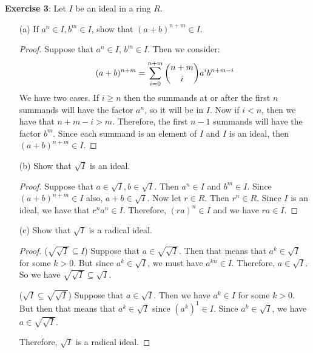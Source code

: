 \documentclass{article}
\begin{document}
\textbf{Exercise 3}: Let $I$ be an ideal in a ring $R$. 
    \begin{itemize}
        \item [(a)] If $a^{n} \in I, b^{m} \in I$, show that $(a + b)^{n + m} \in I$.
            \begin{proof}
                Suppose that $a^{n} \in I$, $b^{m} \in I$. Then we consider:
                    \begin{equation*}
                        (a + b)^{n + m} = \sum_{i = 0}^{n + m} \dbinom{n +  m}{i}a^{i}b^{n + m - i}
                    \end{equation*}
                We have two cases. If $i \geq n$ then the summands at or after the first $n$ summands will have the factor $a^{n}$, so it will be in $I$. Now if $i < n$, then we have that $n + m - i > m$. Therefore, the first $n - 1$ summands will have the factor $b^{m}$. Since each summand is an element of $I$ and $I$ is an ideal, then $(a + b)^{n + m} \in I$.
            \end{proof}

        \item [(b)] Show that $\sqrt{I}$ is an ideal.
            \begin{proof}
                Suppose that $a \in \sqrt{I}, b \in \sqrt{I}$. Then $a^{n} \in I$ and $b^{m} \in I$. Since $(a + b)^{n + m} \in I$ also, $a + b \in \sqrt{I}$. Now let $r \in R$. Then $r^{n} \in R$. Since $I$ is an ideal, we have that $r^{n}a^{n} \in I$. Therefore, $(ra)^{n} \in I$ and we have $ra \in I$.
            \end{proof}

        \item [(c)] Show that $\sqrt{I}$ is a radical ideal.
            \begin{proof}
                ($\sqrt{\sqrt{I}} \subseteq I$) Suppose that $a \in \sqrt{\sqrt{I}}$. Then that means that $a^{k} \in \sqrt{I}$ for some $k > 0$. But since $a^{k} \in \sqrt{I}$, we must have $a^{kn} \in I$. Therefore, $a \in \sqrt{I}$. So we have $\sqrt{\sqrt{I}} \subseteq \sqrt{I}$.

                ($\sqrt{I} \subseteq \sqrt{\sqrt{I}}$) Suppose that $a \in \sqrt{I}$. Then we have $a^{k} \in I$ for some $k > 0$. But then that means that $a^{k} \in \sqrt{I}$ since $(a^{k})^{1} \in I$. Since $a^{k} \in \sqrt{I}$, we have $a \in \sqrt{\sqrt{I}}$.

                Therefore, $\sqrt{I}$ is a radical ideal.
            \end{proof}


\end{itemize}
\end{document}
